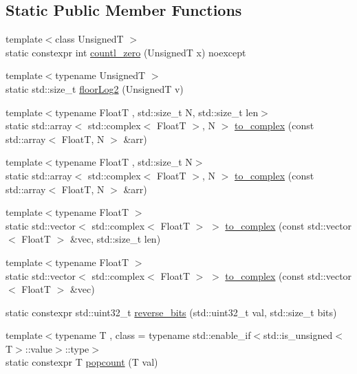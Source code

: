 \subsection*{Static Public Member Functions}
\begin{DoxyCompactItemize}
\item 
{\footnotesize template$<$class UnsignedT $>$ }\\static constexpr int \hyperlink{structdevfix_1_1base_1_1math_a01f04c02cfad1ad74a133d85214bfdf0}{countl\+\_\+zero} (UnsignedT x) noexcept
\item 
{\footnotesize template$<$typename UnsignedT $>$ }\\static std\+::size\+\_\+t \hyperlink{structdevfix_1_1base_1_1math_a8d1fda6ee4b131fffded8562f4f5ad4e}{floor\+Log2} (UnsignedT v)
\item 
{\footnotesize template$<$typename FloatT , std\+::size\+\_\+t N, std\+::size\+\_\+t len$>$ }\\static std\+::array$<$ std\+::complex$<$ FloatT $>$, N $>$ \hyperlink{structdevfix_1_1base_1_1math_aa125625a1d4063dc4bd4de82f7367f14}{to\+\_\+complex} (const std\+::array$<$ FloatT, N $>$ \&arr)
\item 
{\footnotesize template$<$typename FloatT , std\+::size\+\_\+t N$>$ }\\static std\+::array$<$ std\+::complex$<$ FloatT $>$, N $>$ \hyperlink{structdevfix_1_1base_1_1math_ad142f8342011042e1420eed41c833db0}{to\+\_\+complex} (const std\+::array$<$ FloatT, N $>$ \&arr)
\item 
{\footnotesize template$<$typename FloatT $>$ }\\static std\+::vector$<$ std\+::complex$<$ FloatT $>$ $>$ \hyperlink{structdevfix_1_1base_1_1math_a0178a6ca347209c523138b9bbaddd9cf}{to\+\_\+complex} (const std\+::vector$<$ FloatT $>$ \&vec, std\+::size\+\_\+t len)
\item 
{\footnotesize template$<$typename FloatT $>$ }\\static std\+::vector$<$ std\+::complex$<$ FloatT $>$ $>$ \hyperlink{structdevfix_1_1base_1_1math_adcc63e97e0ff2fed3526451d56a28d24}{to\+\_\+complex} (const std\+::vector$<$ FloatT $>$ \&vec)
\item 
static constexpr std\+::uint32\+\_\+t \hyperlink{structdevfix_1_1base_1_1math_af3260ac1a62b3e9f6feb0f212aa8f796}{reverse\+\_\+bits} (std\+::uint32\+\_\+t val, std\+::size\+\_\+t bits)
\item 
{\footnotesize template$<$typename T , class  = typename std\+::enable\+\_\+if$<$std\+::is\+\_\+unsigned$<$\+T$>$\+::value$>$\+::type$>$ }\\static constexpr T \hyperlink{structdevfix_1_1base_1_1math_a43815037f45e01d90a6c0cb0e1d8ef11}{popcount} (T val)
\end{DoxyCompactItemize}
